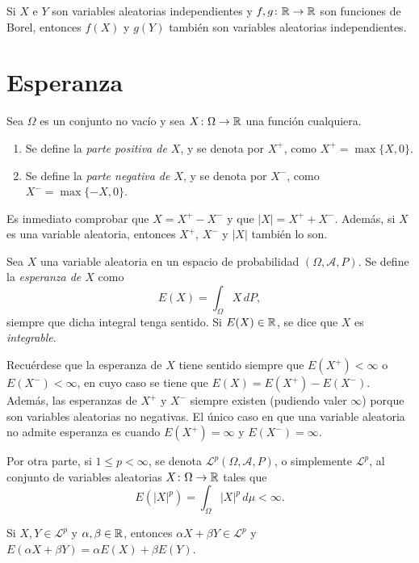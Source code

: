 \documentclass[a4paper, 11pt, extrafontsizes]{memoir}
\begin{document}
\begin{proposition}
    Si $X$ e $Y$ son variables aleatorias independientes y $f,g \colon \mathbb R \to \mathbb R$ son funciones de Borel, entonces $f(X)$ y $g(Y)$ también son variables aleatorias independientes.
\end{proposition}

\section{Esperanza}

\begin{definition}
    Sea $\Omega$ es un conjunto no vacío y sea $X \colon \Omega \to \mathbb R$ una función cualquiera.
    \begin{enumerate}
    \item Se define la \emph{parte positiva de $X$}, y se denota por $X^+$, como $X^+ = \max\{X,0\}$.
    \item Se define la \emph{parte negativa de $X$}, y se denota por $X^-$, como $X^- = \max\{-X,0\}$.
    \end{enumerate}
\end{definition}

Es inmediato comprobar que $X = X^+ - X^-$ y que $|X| = X^+ + X^-$. Además, si $X$ es una variable aleatoria, entonces $X^+$, $X^-$ y $|X|$ también lo son.

\begin{definition}
    Sea $X$ una variable aleatoria en un espacio de probabilidad $(\Omega,\mathcal{A},P)$. Se define la \emph{esperanza de $X$} como
    \[E(X) = \int_\Omega X \, dP,\]
    siempre que dicha integral tenga sentido. Si $E(X) \in \mathbb R$, se dice que $X$ es \emph{integrable}.
\end{definition}

Recuérdese que la esperanza de $X$ tiene sentido siempre que $E(X^+)<\infty$ o $E(X^-) < \infty$, en cuyo caso se tiene que $E(X) = E(X^+)-E(X^-)$. Además, las esperanzas de $X^+$ y $X^-$ siempre existen (pudiendo valer $\infty$) porque son variables aleatorias no negativas. El único caso en que una variable aleatoria no admite esperanza es cuando $E(X^+) = \infty$ y $E(X^-) = \infty$.

Por otra parte, si $1 \leq p < \infty$, se denota $\mathcal{L}^p(\Omega,\mathcal{A},P)$, o simplemente $\mathcal{L}^p$, al conjunto de variables aleatorias $X \colon \Omega \to \mathbb R$ tales que
\[E(|X|^p) = \int_\Omega |X|^p \, d\mu < \infty.\]

\begin{proposition}
    Si $X, Y \in \mathcal{L}^p$ y $\alpha,\beta \in \mathbb R$, entonces $\alpha X + \beta Y \in \mathcal{L}^p$ y $E(\alpha X + \beta Y) = \alpha E(X)+\beta E(Y)$.
\end{proposition}
\end{document}
